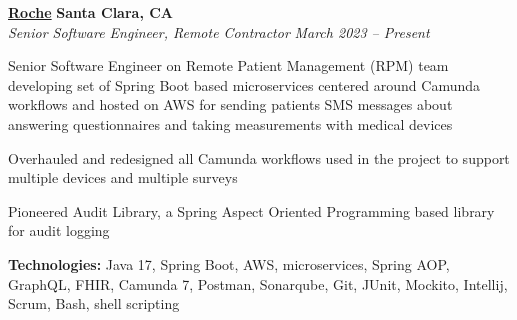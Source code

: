 %
    \headerrow
        {\textbf{\href{https://www.roche.com/}{Roche}}}
        {\textbf{Santa Clara, CA}}
    \\
    \headerrow
        {\emph{Senior Software Engineer, Remote Contractor}}
        {\emph{March 2023 -- Present}}
    \begin{itemize*}
        \item Senior Software Engineer on Remote Patient Management (RPM) team developing set of Spring Boot based microservices centered around Camunda workflows and hosted on AWS for sending patients SMS messages about answering questionnaires and taking measurements with medical devices
        \item Overhauled and redesigned all Camunda workflows used in the project to support multiple devices and multiple surveys
        \item Pioneered Audit Library, a Spring Aspect Oriented Programming based library for audit logging
    \end{itemize*}

    \hspace{1.0em}
        {\textbf{Technologies:} Java 17, Spring Boot, AWS, microservices, Spring AOP, GraphQL, FHIR, Camunda 7, Postman, Sonarqube, Git, JUnit, Mockito, Intellij, Scrum, Bash, shell scripting}

